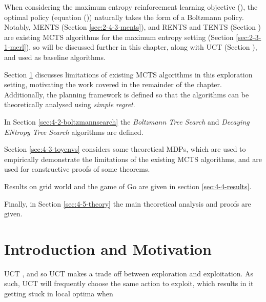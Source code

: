     When considering the maximum entropy reinforcement learning objective (), the optimal policy (equation ()) naturally takes the form of a Boltzmann policy. Notably, MENTS (Section \ref{sec:2-4-3-ments}), and RENTS and TENTS (Section ) are existing MCTS algorithms for the maximum entropy setting (Section \ref{sec:2-3-1-merl}), so will be discussed further in this chapter, along with UCT (Section ), and used as baseline algorithms.

    Section \ref{sec:4-1-intro} discusses limitations of existing MCTS algorithms in this exploration setting, motivating the work covered in the remainder of the chapter. Additionally, the planning framework is defined so that the algorithms can be theoretically analysed using \textit{simple regret}.
    
    In Section \ref{sec:4-2-boltzmannsearch} the \textit{Boltzmann Tree Search} and \textit{Decaying ENtropy Tree Search} algorithms are defined.

    Section \ref{sec:4-3-toyenvs} considers some theoretical MDPs, which are used to empirically demonstrate the limitations of the existing MCTS algorithms, and are used for constructive proofs of some theorems. 

    Results on grid world and the game of Go are given in section \ref{sec:4-4-results}. 

    Finally, in Section \ref{sec:4-5-theory} the main theoretical analysis and proofs are given.



    







\section{Introduction and Motivation}
\label{sec:4-1-intro}

    UCT  , and so UCT makes a trade off between exploration and exploitation. As such, UCT will frequently choose the same action to exploit, which results in it getting stuck in local optima when 

